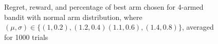 \documentclass[12pt, a4paper,DIV=12, bibliography=totocnumbered]{scrartcl}
\begin{document}
\begin{figure}[h]
\hfill
{}\par
{}
\caption{Regret, reward, and percentage of best arm chosen for 
    4-armed bandit with normal arm distribution, where $(\mu,\sigma)\in\{(1,0.2),(1.2,0.4)(1.1,0.6),(1.4,0.8)\}$, averaged for 1000 trials}
\end{figure}
\end{document}
